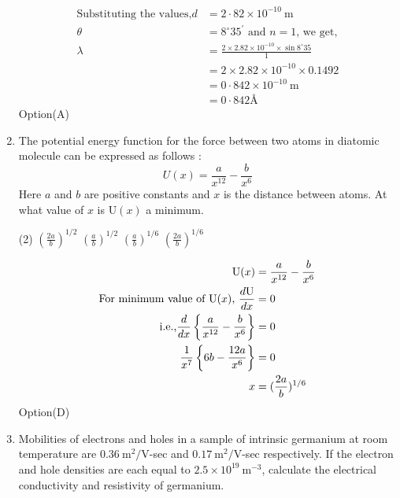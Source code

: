 \begin{enumerate}
\begin{answer}
$$\begin{aligned}
\\\text{Substituting the values,} d&=2 \cdot 82 \times 10^{-10} \mathrm{~m}\\
 \theta&=8^{\circ} 35^{\prime} \text{ and $n=1$, we get,}\\
 \lambda &=\frac{2 \times 2.82 \times 10^{-10} \times \sin 8^{\circ} 35}{1} \\
 &=2 \times 2.82 \times 10^{-10} \times 0.1492 \\
 &=0 \cdot 842 \times 10^{-10} \mathrm{~m} \\
 &=0 \cdot 842 \text{\AA}
\end{aligned}
$$
Option(A)
\end{answer}
\item The potential energy function for the force between two atoms in diatomic molecule can be expressed as follows :
$$
U(x)=\frac{a}{x^{12}}-\frac{b}{x^{6}}
$$
Here $a$ and $b$ are positive constants and $x$ is the distance between atoms. At what value of $x$ is $\mathrm{U}(x)$ a minimum.
\begin{tasks}(2)
	\task[\textbf{a.}]$(\frac{2 a}{b})^{1 / 2}$  
	\task[\textbf{b.}]$(\frac{ a}{b})^{1 / 2}$  
	\task[\textbf{c.}] $(\frac{ a}{b})^{1 / 6}$  
	\task[\textbf{d.}] $(\frac{2 a}{b})^{1 / 6}$  
\end{tasks}
\begin{answer}
	$$\begin{aligned}
		\mathrm{U}(x)&=\frac{a}{x^{12}}-\frac{b}{x^{6}}\\
		 \text{For minimum value of $ \mathrm{U}(x)$, }  \frac{d \mathrm{U}}{d x}&=0 \\
		 \text{i.e.,} \frac{d}{d x}\left\{\frac{a}{x^{12}}-\frac{b}{x^{6}}\right\}&=0\\
		 \frac{1}{x^{7}}\left\{6 b-\frac{12 a}{x^{6}}\right\}&=0\\
		 x&=(\frac{2 a}{b})^{1 / 6}
	\end{aligned}$$
	Option(D)
\end{answer}
\item Mobilities of electrons and holes in a sample of intrinsic germanium at room temperature are $0.36 \mathrm{~m}^{2} / \mathrm{V}$-sec and $0.17 \mathrm{~m}^{2} / \mathrm{V}$-sec respectively. If the electron and hole densities are each equal to $2.5 \times 10^{19} \mathrm{~m}^{-3}$, calculate the electrical conductivity and resistivity of germanium.


\end{enumerate}
